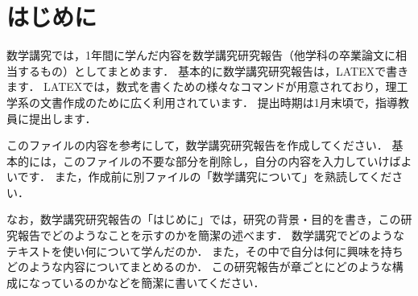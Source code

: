 \chapter{はじめに}

数学講究では，1年間に学んだ内容を数学講究研究報告（他学科の卒業論文に相当するもの）としてまとめます．
基本的に数学講究研究報告は，LATEXで書きます．
LATEXでは，数式を書くための様々なコマンドが用意されており，理工学系の文書作成のために広く利用されています．
提出時期は1月末頃で，指導教員に提出します．

このファイルの内容を参考にして，数学講究研究報告を作成してください．
基本的には，このファイルの不要な部分を削除し，自分の内容を入力していけばよいです．
また，作成前に別ファイルの「数学講究について」を熟読してください．

\bigskip
なお，数学講究研究報告の「はじめに」では，研究の背景・目的を書き，この研究報告でどのようなことを示すのかを簡潔の述べます．
数学講究でどのようなテキストを使い何について学んだのか．
また，その中で自分は何に興味を持ちどのような内容についてまとめるのか．
この研究報告が章ごとにどのような構成になっているのかなどを簡潔に書いてください．
